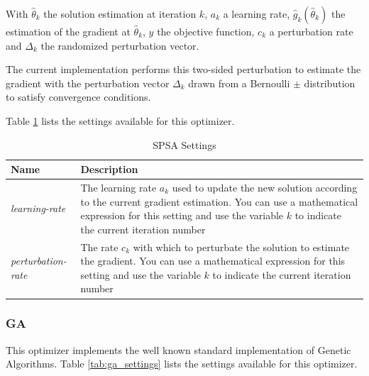 \documentclass{article}
\begin{document}
With $\hat{\theta}_k$ the solution estimation at iteration $k$, $a_k$ a learning
rate, $\hat{g}_k(\hat{\theta}_k)$ the estimation of the gradient at
$\hat{\theta}_k$, $y$ the objective function, $c_k$ a perturbation rate and
$\Delta_k$ the randomized perturbation vector.

The current implementation performs this two-sided perturbation to estimate the
gradient with the perturbation vector $\Delta_k$ drawn from a Bernoulli $\pm$
distribution to satisfy convergence conditions.

Table \ref{tab:spsa_settings} lists the settings available for this optimizer.

\begin{table}[h!tb]\caption{SPSA Settings}\label{tab:spsa_settings}\vspace{0.1in}
	\centering

	\begin{tabular}{p{4cm} p{10cm}}
		\toprule
		\textbf{Name} & \textbf{Description} \\
		\midrule
		\textit{learning-rate} & The learning rate $a_k$ used to update the
		                         new solution according to the current gradient
		                         estimation. You can use a mathematical
		                         expression for this setting and use the
		                         variable $k$ to indicate the current iteration
		                         number \\
		\textit{perturbation-rate} & The rate $c_k$ with which to perturbate the 
		                             solution to estimate the gradient. You
		                             can use a mathematical expression for this
		                             setting and use the variable $k$ to
		                             indicate the current iteration number \\
		\bottomrule
	\end{tabular}
\end{table}

\subsubsection{GA}
This optimizer implements the well known standard implementation of 
Genetic Algorithms. Table \ref{tab:ga_settings} lists the settings available
for this optimizer.
\end{document}
